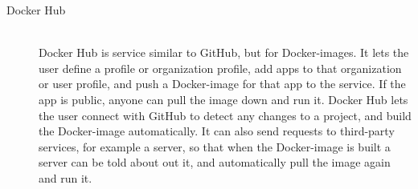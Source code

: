 \begin{description}
    \item[Docker Hub] \hfill \\
        Docker Hub is service similar to GitHub, but for Docker-images. \cite{dockerhub} It lets the user define a profile or organization profile, add apps to that organization or user profile, and push a Docker-image for that app to the service. If the app is public, anyone can pull the image down and run it. Docker Hub lets the user connect with GitHub to detect any changes to a project, and build the Docker-image automatically. It can also send requests to third-party services, for example a server, so that when the Docker-image is built a server can be told about out it, and automatically pull the image again and run it.
        
\end{description}

